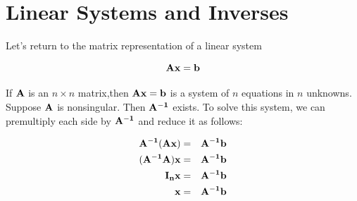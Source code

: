 \documentclass[]{book}
\theoremstyle{definition}
\theoremstyle{definition}
\theoremstyle{definition}
\theoremstyle{remark}
\begin{document}




\section{Linear Systems and Inverses}\label{linear-systems-and-inverses}

Let's return to the matrix representation of a linear system

\[\bf{Ax} = \bf{b}\]

If \(\bf{A}\) is an \(n\times n\) matrix,then \(\bf{Ax}=\bf{b}\) is a
system of \(n\) equations in \(n\) unknowns. Suppose \(\bf{A}\) is
nonsingular. Then \(\bf{A}^{-1}\) exists. To solve this system, we can
premultiply each side by \(\bf{A}^{-1}\) and reduce it as follows:

\begin{eqnarray*} 
\bf{A}^{-1} (\bf{A} \bf{x}) & = & \bf{A}^{-1} \bf{b} \\
(\bf{A}^{-1} \bf{A})\bf{x} & = & \bf{A}^{-1} \bf{b}\\
\bf{I}_n \bf{x}     & = & \bf{A}^{-1} \bf{b}\\
\bf{x} & = & \bf{A}^{-1} \bf{b}
\end{eqnarray*}
\end{document}

